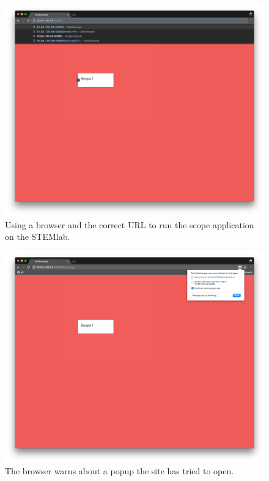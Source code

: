 \begin{figure}
    \centering
    \includegraphics[width=1\textwidth]{images/userguide/url}
    \caption[Entering the URL]{%
        Using a browser and the correct URL to run the scope application on the STEMlab.
    }
    \label{fig:userguide:url}
\end{figure}

\begin{figure}
    \centering
    \includegraphics[width=1\textwidth]{images/userguide/popup_warn}
    \caption[The popup warn popup]{%
        The browser warns about a popup the site has tried to open.
    }
    \label{fig:userguide:popup:warn}
\end{figure}

